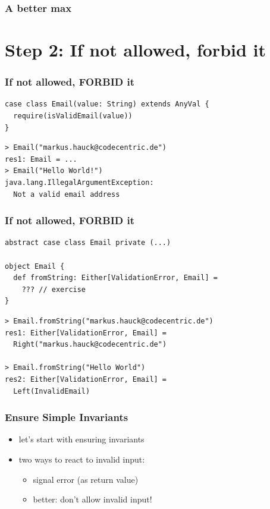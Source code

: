 \documentclass{beamer}
\begin{document}
\begin{frame}
  \frametitle{A better max}
  
\end{frame}

\section{Step 2: If not allowed, forbid it}

\begin{frame}[fragile]
  \frametitle{If not allowed, FORBID it}
\begin{verbatim}
case class Email(value: String) extends AnyVal {
  require(isValidEmail(value))
}
\end{verbatim}
\begin{verbatim}
> Email("markus.hauck@codecentric.de")
res1: Email = ...
> Email("Hello World!")
java.lang.IllegalArgumentException: 
  Not a valid email address                      
\end{verbatim}
\end{frame}

\begin{frame}
  \frametitle{If not allowed, FORBID it}
\begin{verbatim}
abstract case class Email private (...)

object Email {
  def fromString: Either[ValidationError, Email] = 
    ??? // exercise
}
\end{verbatim}

\begin{verbatim}
> Email.fromString("markus.hauck@codecentric.de")
res1: Either[ValidationError, Email] = 
  Right("markus.hauck@codecentric.de")

> Email.fromString("Hello World")
res2: Either[ValidationError, Email] = 
  Left(InvalidEmail)
\end{verbatim}
\end{frame}

\begin{frame}
  \frametitle{Ensure Simple Invariants}
  \begin{itemize}
  \item let's start with ensuring invariants
  \item two ways to react to invalid input:
    \begin{itemize}
    \item signal error (as return value)
    \item better: don't allow invalid input!
    \end{itemize}
  \end{itemize}
\end{frame}
\end{document}
